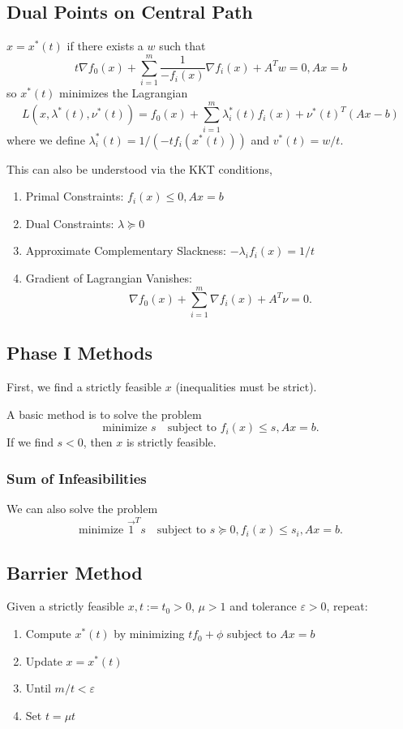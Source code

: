 \documentclass[11pt]{article}
\begin{document}
\subsection{Dual Points on Central Path} 
$x = x^*(t)$ if there exists a $w$ such that 
\[ t \nabla f_0(x) + \sum_{i=1}^m \frac{1}{-f_i(x)} \nabla f_i(x) + A^Tw = 0, Ax = b \] 
so $x^*(t)$ minimizes the Lagrangian 
\[ L(x, \lambda^*(t), \nu^*(t)) = f_0(x) + \sum_{i=1}^m \lambda_i^*(t)f_i(x) + \nu^*(t)^T(Ax - b) \] 
where we define $\lambda_i^*(t) = 1/(-t f_i(x^*(t)))$ and $v^*(t) = w/t$. \par 
This can also be understood via the KKT conditions, 
\begin{enumerate}[label=(\alph*)]
    \item Primal Constraints: $f_i(x) \leq 0, Ax = b$
    \item Dual Constraints: $\lambda \succeq 0$
    \item Approximate Complementary Slackness: $-\lambda_i f_i(x) = 1/t$
    \item Gradient of Lagrangian Vanishes: 
    \[ \nabla f_0(x) + \sum_{i=1}^m \nabla f_i(x) + A^T\nu = 0. \] 
\end{enumerate}

\subsection{Phase I Methods} 
First, we find a strictly feasible $x$ (inequalities must be strict). \par 
A basic method is to solve the problem 
\[ \text{minimize } s \quad \text{subject to } f_i(x) \leq s, Ax = b. \] 
If we find $s < 0$, then $x$ is strictly feasible. \par 

\subsubsection*{Sum of Infeasibilities}
We can also solve the problem 
\[ \text{minimize }\vec{1}^Ts \quad \text{subject to } s \succeq 0, f_i(x) \leq s_i, Ax = b. \] 

\subsection{Barrier Method} 
Given a strictly feasible $x, t := t_0 > 0$, $\mu > 1$ and tolerance $\varepsilon > 0$, repeat:
\begin{enumerate}[label=\arabic*.]
    \item Compute $x^*(t)$ by minimizing $tf_0 + \phi$ subject to $Ax = b$
    \item Update $x = x^*(t)$
    \item Until $m/t < \varepsilon$
    \item Set $t = \mu t$
\end{enumerate}
\end{document}
